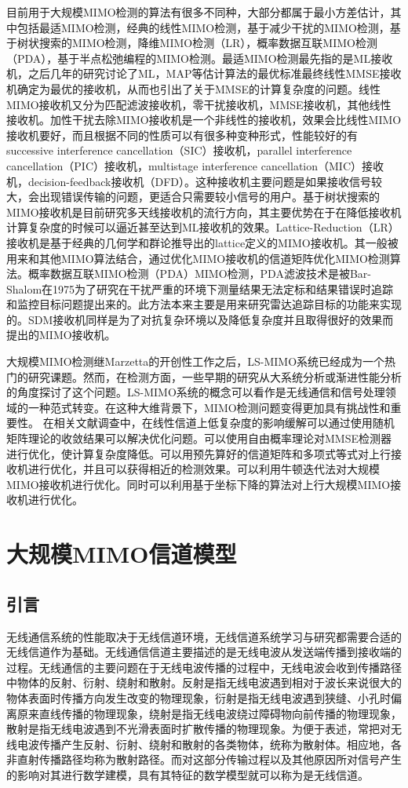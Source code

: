 \documentclass[bachelor,nocolorlinks, printoneside]{seuthesis} %
\begin{document}
\begin{Main}
目前用于大规模MIMO检测的算法有很多不同种，大部分都属于最小方差估计，其中包括最适MIMO检测，经典的线性MIMO检测，基于减少干扰的MIMO检测，基于树状搜索的MIMO检测，降维MIMO检测（LR），概率数据互联MIMO检测（PDA），基于半点松弛编程的MIMO检测。最适MIMO检测最先指的是ML接收机，之后几年的研究讨论了ML，MAP等估计算法的最优标准最终线性MMSE接收机确定为最优的接收机，从而也引出了关于MMSE的计算复杂度的问题。线性MIMO接收机又分为匹配滤波接收机，零干扰接收机，MMSE接收机，其他线性接收机。加性干扰去除MIMO接收机是一个非线性的接收机，效果会比线性MIMO接收机要好，而且根据不同的性质可以有很多种变种形式，性能较好的有successive interference cancellation（SIC）接收机，parallel interference cancellation（PIC）接收机，multistage interference cancellation（MIC）接收机，decision-feedback接收机（DFD）。这种接收机主要问题是如果接收信号较大，会出现错误传输的问题，更适合只需要较小信号的用户。基于树状搜索的MIMO接收机是目前研究多天线接收机的流行方向，其主要优势在于在降低接收机计算复杂度的时候可以逼近甚至达到ML接收机的效果。Lattice-Reduction（LR）接收机是基于经典的几何学和群论推导出的lattice定义的MIMO接收机。其一般被用来和其他MIMO算法结合，通过优化MIMO接收机的信道矩阵优化MIMO检测算法。概率数据互联MIMO检测（PDA）MIMO检测，PDA滤波技术是被Bar-Shalom在1975为了研究在干扰严重的环境下测量结果无法定标和结果错误时追踪和监控目标问题提出来的。此方法本来主要是用来研究雷达追踪目标的功能来实现的。SDM接收机同样是为了对抗复杂环境以及降低复杂度并且取得很好的效果而提出的MIMO接收机。

大规模MIMO检测继Marzetta的开创性工作之后，LS-MIMO系统已经成为一个热门的研究课题。然而，在检测方面，一些早期的研究从大系统分析或渐进性能分析的角度探讨了这个问题。LS-MIMO系统的概念可以看作是无线通信和信号处理领域的一种范式转变。在这种大维背景下，MIMO检测问题变得更加具有挑战性和重要性。
在相关文献调查中，在线性信道上低复杂度的影响缓解可以通过使用随机矩阵理论的收敛结果可以解决优化问题。可以使用自由概率理论对MMSE检测器进行优化，使计算复杂度降低。可以用预先算好的信道矩阵和多项式等式对上行接收机进行优化，并且可以获得相近的检测效果。可以利用牛顿迭代法对大规模MIMO接收机进行优化。同时可以利用基于坐标下降的算法对上行大规模MIMO接收机进行优化。

\chapter{大规模MIMO信道模型}
\section{引言}
无线通信系统的性能取决于无线信道环境，无线信道系统学习与研究都需要合适的无线信道作为基础。无线通信信道主要描述的是无线电波从发送端传播到接收端的过程。无线通信的主要问题在于无线电波传播的过程中，无线电波会收到传播路径中物体的反射、衍射、绕射和散射。反射是指无线电波遇到相对于波长来说很大的物体表面时传播方向发生改变的物理现象，衍射是指无线电波遇到狭缝、小孔时偏离原来直线传播的物理现象，绕射是指无线电波绕过障碍物向前传播的物理现象，散射是指无线电波遇到不光滑表面时扩散传播的物理现象。为便于表述，常把对无线电波传播产生反射、衍射、绕射和散射的各类物体，统称为散射体。相应地，各非直射传播路径均称为散射路径。而对这部分传输过程以及其他原因所对信号产生的影响对其进行数学建模，具有其特征的数学模型就可以称为是无线信道。


\end{Main}
\end{document}
